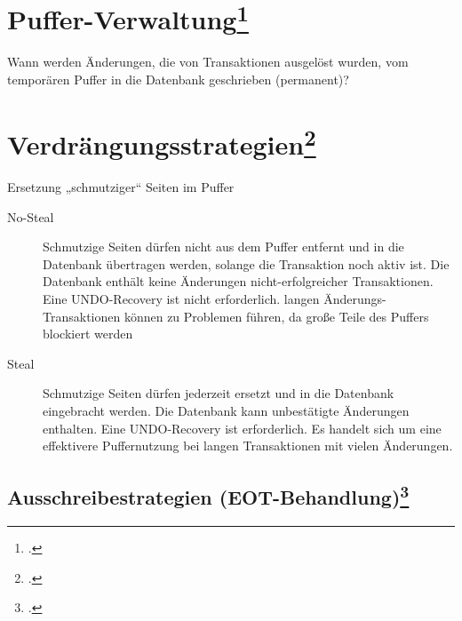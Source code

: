 \documentclass{bschlangaul-theorie}
\begin{document}
%

\section{Puffer-Verwaltung\footcite[Kapitel 10.2.1 Ersetzung von Puffer-Seiten Seite 311]{kemper}}

Wann werden Änderungen, die von Transaktionen ausgelöst wurden, vom
temporären Puffer in die Datenbank geschrieben (permanent)?

%

\section{Verdrängungsstrategien\footcite[Kapitel 10.2.1 Ersetzung von
Puffer-Seiten Seite 311-312]{kemper}}

Ersetzung „schmutziger“ Seiten im Puffer

\begin{description}

\item [No-Steal]

Schmutzige Seiten dürfen nicht aus dem Puffer entfernt und in die
Datenbank übertragen werden, solange die Transaktion noch aktiv ist. Die
Datenbank enthält keine Änderungen nicht-erfolgreicher Transaktionen.
Eine UNDO-Recovery ist nicht erforderlich. langen
Änderungs-Transaktionen können zu Problemen führen, da große Teile des
Puffers blockiert werden

\item [Steal]

Schmutzige Seiten dürfen jederzeit ersetzt und in die Datenbank
eingebracht werden. Die Datenbank kann unbestätigte Änderungen
enthalten. Eine UNDO-Recovery ist erforderlich. Es handelt sich um eine
effektivere Puffernutzung bei langen Transaktionen mit vielen
Änderungen.
\end{description}

%

\subsection{Ausschreibestrategien (EOT-Behandlung)\footcite[Kapitel
10.2.2 Einbringen von Änderungen einer Transaktion Seite
312-313]{kemper}}
\end{document}
